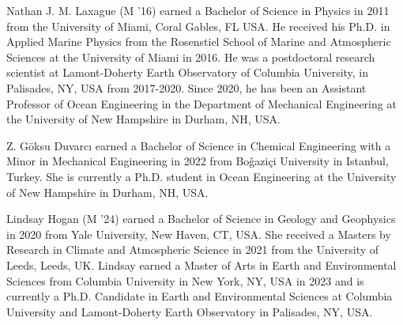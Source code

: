 \documentclass[letterpaper,journal]{IEEEtran}
\begin{document}
\begin{IEEEbiography}{Nathan J. M. Laxague}
(M '16) earned a Bachelor of Science in Physics in 2011 from the University of Miami, Coral Gables, FL USA. He received his Ph.D. in Applied Marine Physics from the Rosenstiel School of Marine and Atmospheric Sciences at the University of Miami in 2016. He was a postdoctoral research scientist at Lamont-Doherty Earth Observatory of Columbia University, in Palisades, NY, USA from 2017-2020. Since 2020, he has been an Assistant Professor of Ocean Engineering in the Department of Mechanical Engineering at the University of New Hampshire in Durham, NH, USA.
\end{IEEEbiography}

\begin{IEEEbiography}
{Z. G\"oksu Duvarc\i}
earned a Bachelor of Science in Chemical Engineering with a Minor in Mechanical Engineering in 2022 from Bo\v gazi\c ci University in Istanbul, Turkey. She is currently a Ph.D. student in Ocean Engineering at the University of New Hampshire in Durham, NH, USA.
\end{IEEEbiography}

\begin{IEEEbiography}{Lindsay Hogan}
(M '24) earned a Bachelor of Science in Geology and Geophysics in 2020 from Yale University, New Haven, CT, USA. She received a Masters by Research in Climate and Atmospheric Science in 2021 from the University of Leeds, Leeds, UK. Lindsay earned a Master of Arts in Earth and Environmental Sciences from Columbia University in New York, NY, USA in 2023 and is currently a Ph.D. Candidate in Earth and Environmental Sciences at Columbia University and Lamont-Doherty Earth Observatory in Palisades, NY, USA.
\end{IEEEbiography}
\end{document}
